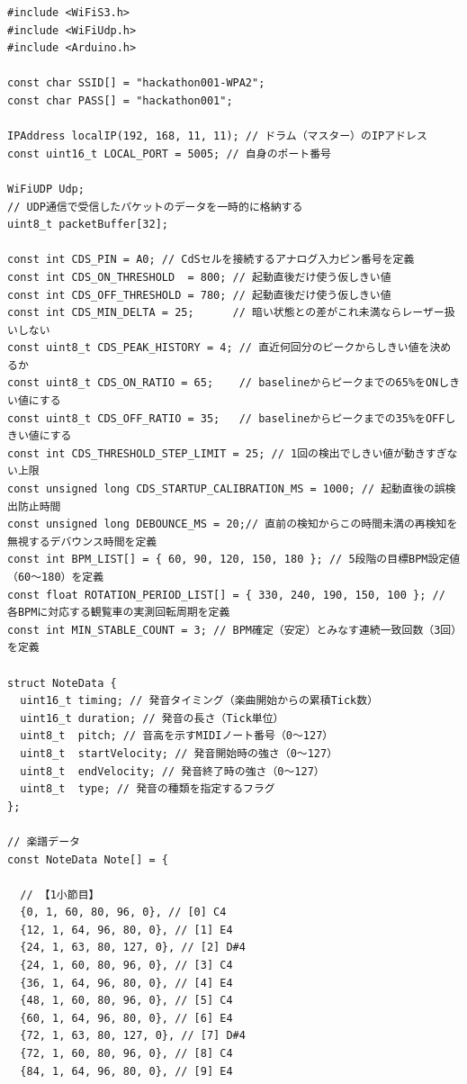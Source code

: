 \begin{lstlisting}[caption={drum\_0706.ino（楽譜データは冒頭2小節のみ掲載）}, label={lst:douki_drum_full}]
#include <WiFiS3.h>
#include <WiFiUdp.h>
#include <Arduino.h>

const char SSID[] = "hackathon001-WPA2";
const char PASS[] = "hackathon001";

IPAddress localIP(192, 168, 11, 11); // ドラム（マスター）のIPアドレス
const uint16_t LOCAL_PORT = 5005; // 自身のポート番号

WiFiUDP Udp;
// UDP通信で受信したパケットのデータを一時的に格納する
uint8_t packetBuffer[32];

const int CDS_PIN = A0; // CdSセルを接続するアナログ入力ピン番号を定義
const int CDS_ON_THRESHOLD  = 800; // 起動直後だけ使う仮しきい値
const int CDS_OFF_THRESHOLD = 780; // 起動直後だけ使う仮しきい値
const int CDS_MIN_DELTA = 25;      // 暗い状態との差がこれ未満ならレーザー扱いしない
const uint8_t CDS_PEAK_HISTORY = 4; // 直近何回分のピークからしきい値を決めるか
const uint8_t CDS_ON_RATIO = 65;    // baselineからピークまでの65%をONしきい値にする
const uint8_t CDS_OFF_RATIO = 35;   // baselineからピークまでの35%をOFFしきい値にする
const int CDS_THRESHOLD_STEP_LIMIT = 25; // 1回の検出でしきい値が動きすぎない上限
const unsigned long CDS_STARTUP_CALIBRATION_MS = 1000; // 起動直後の誤検出防止時間
const unsigned long DEBOUNCE_MS = 20;// 直前の検知からこの時間未満の再検知を無視するデバウンス時間を定義
const int BPM_LIST[] = { 60, 90, 120, 150, 180 }; // 5段階の目標BPM設定値（60〜180）を定義
const float ROTATION_PERIOD_LIST[] = { 330, 240, 190, 150, 100 }; // 各BPMに対応する観覧車の実測回転周期を定義
const int MIN_STABLE_COUNT = 3; // BPM確定（安定）とみなす連続一致回数（3回）を定義

struct NoteData {
  uint16_t timing; // 発音タイミング（楽曲開始からの累積Tick数）
  uint16_t duration; // 発音の長さ（Tick単位）
  uint8_t  pitch; // 音高を示すMIDIノート番号（0〜127）
  uint8_t  startVelocity; // 発音開始時の強さ（0〜127）
  uint8_t  endVelocity; // 発音終了時の強さ（0〜127）
  uint8_t  type; // 発音の種類を指定するフラグ
};

// 楽譜データ
const NoteData Note[] = {

  // 【1小節目】
  {0, 1, 60, 80, 96, 0}, // [0] C4
  {12, 1, 64, 96, 80, 0}, // [1] E4
  {24, 1, 63, 80, 127, 0}, // [2] D#4
  {24, 1, 60, 80, 96, 0}, // [3] C4
  {36, 1, 64, 96, 80, 0}, // [4] E4
  {48, 1, 60, 80, 96, 0}, // [5] C4
  {60, 1, 64, 96, 80, 0}, // [6] E4
  {72, 1, 63, 80, 127, 0}, // [7] D#4
  {72, 1, 60, 80, 96, 0}, // [8] C4
  {84, 1, 64, 96, 80, 0}, // [9] E4


\end{lstlisting}
